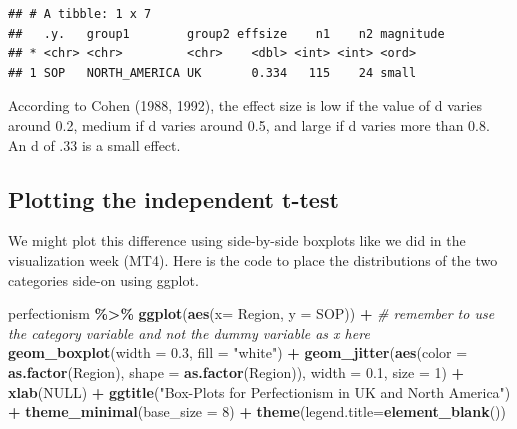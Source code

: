 \documentclass[
]{article}
\newenvironment{Shaded}{\begin{snugshade}}{\end{snugshade}}
\newcommand{\AttributeTok}[1]{\textcolor[rgb]{0.13,0.29,0.53}{#1}}
\newcommand{\CommentTok}[1]{\textcolor[rgb]{0.56,0.35,0.01}{\textit{#1}}}
\newcommand{\ConstantTok}[1]{\textcolor[rgb]{0.56,0.35,0.01}{#1}}
\newcommand{\DecValTok}[1]{\textcolor[rgb]{0.00,0.00,0.81}{#1}}
\newcommand{\FloatTok}[1]{\textcolor[rgb]{0.00,0.00,0.81}{#1}}
\newcommand{\FunctionTok}[1]{\textcolor[rgb]{0.13,0.29,0.53}{\textbf{#1}}}
\newcommand{\NormalTok}[1]{#1}
\newcommand{\SpecialCharTok}[1]{\textcolor[rgb]{0.81,0.36,0.00}{\textbf{#1}}}
\newcommand{\StringTok}[1]{\textcolor[rgb]{0.31,0.60,0.02}{#1}}
\begin{document}
\begin{verbatim}
## # A tibble: 1 x 7
##   .y.   group1        group2 effsize    n1    n2 magnitude
## * <chr> <chr>         <chr>    <dbl> <int> <int> <ord>    
## 1 SOP   NORTH_AMERICA UK       0.334   115    24 small
\end{verbatim}

According to Cohen (1988, 1992), the effect size is low if the value of
d varies around 0.2, medium if d varies around 0.5, and large if d
varies more than 0.8. An d of .33 is a small effect.

\subsection{Plotting the independent
t-test}\label{plotting-the-independent-t-test}

We might plot this difference using side-by-side boxplots like we did in
the visualization week (MT4). Here is the code to place the
distributions of the two categories side-on using ggplot.

\begin{Shaded}
\begin{Highlighting}[]
\NormalTok{perfectionism }\SpecialCharTok{\%\textgreater{}\%}
\FunctionTok{ggplot}\NormalTok{(}\FunctionTok{aes}\NormalTok{(}\AttributeTok{x=}\NormalTok{ Region, }\AttributeTok{y =}\NormalTok{ SOP)) }\SpecialCharTok{+} \CommentTok{\# remember to use the category variable and not the dummy variable as x here}
  \FunctionTok{geom\_boxplot}\NormalTok{(}\AttributeTok{width =} \FloatTok{0.3}\NormalTok{, }\AttributeTok{fill =} \StringTok{"white"}\NormalTok{) }\SpecialCharTok{+}
  \FunctionTok{geom\_jitter}\NormalTok{(}\FunctionTok{aes}\NormalTok{(}\AttributeTok{color =} \FunctionTok{as.factor}\NormalTok{(Region), }\AttributeTok{shape =} \FunctionTok{as.factor}\NormalTok{(Region)), }\AttributeTok{width =} \FloatTok{0.1}\NormalTok{, }\AttributeTok{size =} \DecValTok{1}\NormalTok{) }\SpecialCharTok{+} 
  \FunctionTok{xlab}\NormalTok{(}\ConstantTok{NULL}\NormalTok{) }\SpecialCharTok{+}
  \FunctionTok{ggtitle}\NormalTok{(}\StringTok{"Box{-}Plots for Perfectionism in UK and North America"}\NormalTok{) }\SpecialCharTok{+}
  \FunctionTok{theme\_minimal}\NormalTok{(}\AttributeTok{base\_size =} \DecValTok{8}\NormalTok{) }\SpecialCharTok{+}
  \FunctionTok{theme}\NormalTok{(}\AttributeTok{legend.title=}\FunctionTok{element\_blank}\NormalTok{())}
\end{Highlighting}
\end{Shaded}
\end{document}
